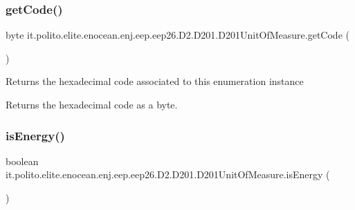 \subsubsection{\texorpdfstring{get\+Code()}{getCode()}}
{\footnotesize\ttfamily byte it.\+polito.\+elite.\+enocean.\+enj.\+eep.\+eep26.\+D2.\+D201.\+D201\+Unit\+Of\+Measure.\+get\+Code (\begin{DoxyParamCaption}{ }\end{DoxyParamCaption})}

Returns the hexadecimal code associated to this enumeration instance

\begin{DoxyReturn}{Returns}
the hexadecimal code as a byte. 
\end{DoxyReturn}
\hypertarget{enumit_1_1polito_1_1elite_1_1enocean_1_1enj_1_1eep_1_1eep26_1_1_d2_1_1_d201_1_1_d201_unit_of_measure_aafd3068de6ae9fcab72f7f4d7a0e525c}{}\label{enumit_1_1polito_1_1elite_1_1enocean_1_1enj_1_1eep_1_1eep26_1_1_d2_1_1_d201_1_1_d201_unit_of_measure_aafd3068de6ae9fcab72f7f4d7a0e525c} 
\subsubsection{\texorpdfstring{is\+Energy()}{isEnergy()}}
{\footnotesize\ttfamily boolean it.\+polito.\+elite.\+enocean.\+enj.\+eep.\+eep26.\+D2.\+D201.\+D201\+Unit\+Of\+Measure.\+is\+Energy (\begin{DoxyParamCaption}{ }\end{DoxyParamCaption})}

\hypertarget{enumit_1_1polito_1_1elite_1_1enocean_1_1enj_1_1eep_1_1eep26_1_1_d2_1_1_d201_1_1_d201_unit_of_measure_ae63a72411ea86bae01f76b26fa2dbe61}{}\label{enumit_1_1polito_1_1elite_1_1enocean_1_1enj_1_1eep_1_1eep26_1_1_d2_1_1_d201_1_1_d201_unit_of_measure_ae63a72411ea86bae01f76b26fa2dbe61} 
